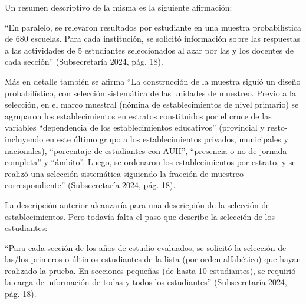 \documentclass[
  spanish,
  a4paper,
]{scrreprt}
\begin{document}
Un resumen descriptivo de la misma es la siguiente afirmación:

``En paralelo, se relevaron resultados por estudiante en una muestra
probabilística de 680 escuelas. Para cada institución, se solicitó
información sobre las respuestas a las actividades de 5 estudiantes
seleccionados al azar por las y los docentes de cada sección''
({Subsecretaría} 2024, pág. 18).

Más en detalle también se afirma ``La construcción de la muestra siguió
un diseño probabilístico, con selección sistemática de las unidades de
muestreo. Previo a la selección, en el marco muestral (nómina de
establecimientos de nivel primario) se agruparon los establecimientos en
estratos constituidos por el cruce de las variables ``dependencia de los
establecimientos educativos'' (provincial y resto-incluyendo en este
último grupo a los establecimientos privados, municipales y nacionales),
``porcentaje de estudiantes con AUH'', ``presencia o no de jornada
completa'' y ``ámbito''. Luego, se ordenaron los establecimientos por
estrato, y se realizó una selección sistemática siguiendo la fracción de
muestreo correspondiente'' ({Subsecretaría} 2024, pág. 18).

La descripción anterior alcanzaría para una descricpión de la selección
de establecimientos. Pero todavía falta el paso que describe la
selección de los estudiantes:

``Para cada sección de los años de estudio evaluados, se solicitó la
selección de las/los primeros o últimos estudiantes de la lista (por
orden alfabético) que hayan realizado la prueba. En secciones pequeñas
(de hasta 10 estudiantes), se requirió la carga de información de todas
y todos los estudiantes'' ({Subsecretaría} 2024, pág. 18).
\end{document}
